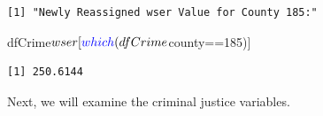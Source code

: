 \documentclass[]{article}
\newenvironment{Shaded}{}{}
\newcommand{\DecValTok}[1]{#1}
\newcommand{\KeywordTok}[1]{\textcolor[rgb]{0.00,0.00,1.00}{#1}}
\newcommand{\NormalTok}[1]{#1}
\newcommand{\OperatorTok}[1]{#1}
\begin{document}
\begin{verbatim}
[1] "Newly Reassigned wser Value for County 185:"
\end{verbatim}

\begin{Shaded}
\begin{Highlighting}[]
\NormalTok{dfCrime}\OperatorTok{$}\NormalTok{wser[}\KeywordTok{which}\NormalTok{(dfCrime}\OperatorTok{$}\NormalTok{county}\OperatorTok{==}\DecValTok{185}\NormalTok{)]}
\end{Highlighting}
\end{Shaded}

\begin{verbatim}
[1] 250.6144
\end{verbatim}

Next, we will examine the criminal justice variables.
\end{document}
